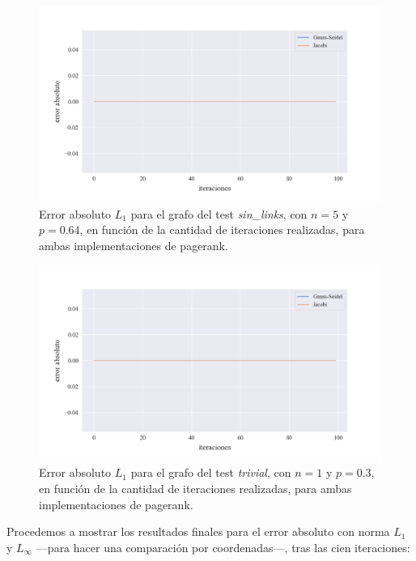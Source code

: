 \begin{figure}[!htbp]
    \centering
    \includegraphics[width=1\textwidth]{files/src/.media/convergencia_test_sin_links.png}
    \caption{Error absoluto $L_1$ para el grafo del test \textit{sin\_links}, con $n = 5$ y $p = 0.64$, en función de la cantidad de iteraciones realizadas, para ambas implementaciones de pagerank.} \label{test_sin_links}
\end{figure}

\begin{figure}[!htbp]
    \centering
    \includegraphics[width=1\textwidth]{files/src/.media/convergencia_test_trivial.png}
    \caption{Error absoluto $L_1$ para el grafo del test \textit{trivial}, con $n = 1$ y $p = 0.3$, en función de la cantidad de iteraciones realizadas, para ambas implementaciones de pagerank.} \label{test_trivial}
\end{figure}

\vspace*{1em}
Procedemos a mostrar los resultados finales para el error absoluto con norma $L_1$ y $L_{\infty}$ ---para hacer una comparación por coordenadas---, tras las cien iteraciones:

